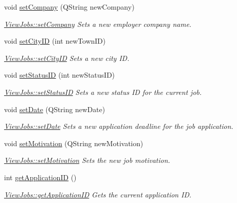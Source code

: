 \begin{DoxyCompactItemize}
void \hyperlink{class_view_jobs_a596246d07be66a5aeaf14ff8e5649290}{set\+Company} (Q\+String new\+Company)
\begin{DoxyCompactList}\small\item\em \hyperlink{class_view_jobs_a596246d07be66a5aeaf14ff8e5649290}{View\+Jobs\+::set\+Company} Sets a new employer company name. \end{DoxyCompactList}\item 
void \hyperlink{class_view_jobs_ad89218b37af85cac9ce6c346efb57e56}{set\+City\+ID} (int new\+Town\+ID)
\begin{DoxyCompactList}\small\item\em \hyperlink{class_view_jobs_ad89218b37af85cac9ce6c346efb57e56}{View\+Jobs\+::set\+City\+ID} Sets a new city ID. \end{DoxyCompactList}\item 
void \hyperlink{class_view_jobs_a55943415fd91377d5f701f7074ba58d6}{set\+Status\+ID} (int new\+Status\+ID)
\begin{DoxyCompactList}\small\item\em \hyperlink{class_view_jobs_a55943415fd91377d5f701f7074ba58d6}{View\+Jobs\+::set\+Status\+ID} Sets a new status ID for the current job. \end{DoxyCompactList}\item 
void \hyperlink{class_view_jobs_a7574794410eb40956f343976de97221f}{set\+Date} (Q\+String new\+Date)
\begin{DoxyCompactList}\small\item\em \hyperlink{class_view_jobs_a7574794410eb40956f343976de97221f}{View\+Jobs\+::set\+Date} Sets a new application deadline for the job application. \end{DoxyCompactList}\item 
void \hyperlink{class_view_jobs_a53bdfabaf2b442841d676f42ebbf975f}{set\+Motivation} (Q\+String new\+Motivation)
\begin{DoxyCompactList}\small\item\em \hyperlink{class_view_jobs_a53bdfabaf2b442841d676f42ebbf975f}{View\+Jobs\+::set\+Motivation} Sets the new job motivation. \end{DoxyCompactList}\item 
int \hyperlink{class_view_jobs_a086650882ad80acb4074cf697f8cddcb}{get\+Application\+ID} ()
\begin{DoxyCompactList}\small\item\em \hyperlink{class_view_jobs_a086650882ad80acb4074cf697f8cddcb}{View\+Jobs\+::get\+Application\+ID} Gets the current application ID. \end{DoxyCompactList}\item 

\end{DoxyCompactItemize}
